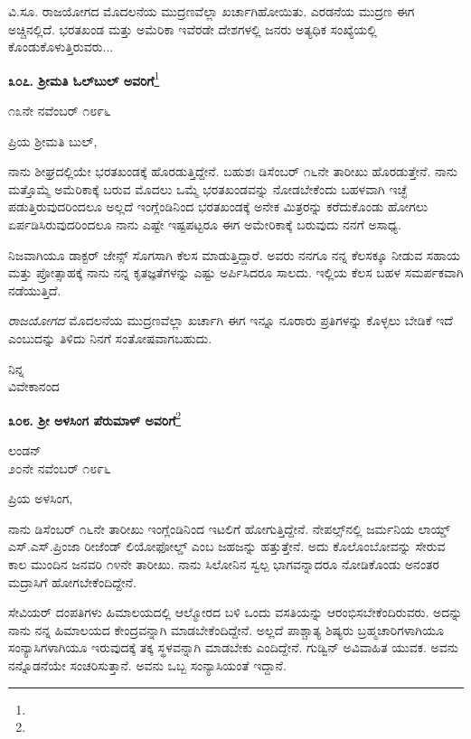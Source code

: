 ವಿ.ಸೂ. ರಾಜಯೋಗದ ಮೊದಲನೆಯ ಮುದ್ರಣವೆಲ್ಲಾ ಖರ್ಚಾಗಿಹೋಯಿತು. ಎರಡನೆಯ ಮುದ್ರಣ ಈಗ ಅಚ್ಚಿನಲ್ಲಿದೆ. ಭರತಖಂಡ ಮತ್ತು ಅಮೆರಿಕಾ ಇವೆರಡೇ ದೇಶಗಳಲ್ಲಿ ಜನರು ಅತ್ಯಧಿಕ ಸಂಖ್ಯೆಯಲ್ಲಿ ಕೊಂಡುಕೊಳುತ್ತಿರುವರು...

\begin{center}
\textbf{೩೦೭. ಶ‍್ರೀಮತಿ ಓಲ್‌ಬುಲ್‌ ಅವರಿಗೆ}\footnote{}
\end{center}

\begin{flushright}
೧೩ನೇ ನವೆಂಬರ್ ೧೮೯೬
\end{flushright}

\noindent
ಪ್ರಿಯ ಶ‍್ರೀಮತಿ ಬುಲ್,

ನಾನು ಶೀಘ್ರದಲ್ಲಿಯೇ ಭರತಖಂಡಕ್ಕೆ ಹೊರಡುತ್ತಿದ್ದೇನೆ. ಬಹುಶಃ ಡಿಸೆಂಬರ್ ೧೬ನೇ ತಾರೀಖು ಹೊರಡುತ್ತೇನೆ. ನಾನು ಮತ್ತೊಮ್ಮೆ ಅಮೆರಿಕಾಕ್ಕೆ ಬರುವ ಮೊದಲು ಒಮ್ಮೆ ಭರತಖಂಡವನ್ನು ನೋಡಬೇಕೆಂದು ಬಹಳವಾಗಿ ಇಚ್ಛೆ ಪಡುತ್ತಿರುವುದರಿಂದಲೂ ಅಲ್ಲದೆ ಇಂಗ್ಲೆಂಡಿನಿಂದ ಭರತಖಂಡಕ್ಕೆ ಅನೇಕ ಮಿತ್ರರನ್ನು ಕರೆದುಕೊಂಡು ಹೋಗಲು ಏರ್ಪಡಿಸಿರುವುದರಿಂದಲೂ ನಾನು ಎಷ್ಟೇ ಇಷ್ಟಪಟ್ಟರೂ ಈಗ ಅಮೇರಿಕಾಕ್ಕೆ ಬರುವುದು ನನಗೆ ಅಸಾಧ್ಯ.

ನಿಜವಾಗಿಯೂ ಡಾಕ್ಟರ್‌ ಜೇನ್ಸ್ ಸೊಗಸಾಗಿ ಕೆಲಸ ಮಾಡುತ್ತಿದ್ದಾರೆ. ಅವರು ನನಗೂ ನನ್ನ ಕೆಲಸಕ್ಕೂ ನೀಡುವ ಸಹಾಯ ಮತ್ತು ಪ್ರೋತ್ಸಾಹಕ್ಕೆ ನಾನು ನನ್ನ ಕೃತಜ್ಞತೆಗಳನ್ನು ಎಷ್ಟು ಅರ್ಪಿಸಿದರೂ ಸಾಲದು. ಇಲ್ಲಿಯ ಕೆಲಸ ಬಹಳ ಸಮರ್ಪಕವಾಗಿ ನಡೆಯುತ್ತಿದೆ.

\textit{ರಾಜಯೋಗದ} ಮೊದಲನೆಯ ಮುದ್ರಣವೆಲ್ಲಾ ಖರ್ಚಾಗಿ ಈಗ ಇನ್ನೂ ನೂರಾರು ಪ್ರತಿಗಳನ್ನು ಕೊಳ್ಳಲು ಬೇಡಿಕೆ ಇದೆ ಎಂಬುದನ್ನು ತಿಳಿದು ನಿನಗೆ ಸಂತೋಷವಾಗಬಹುದು.

{\flushright
ನಿನ್ನ\\ವಿವೇಕಾನಂದ\par}

\begin{center}
\textbf{೩೦೮. ಶ‍್ರೀ ಅಳಸಿಂಗ ಪೆರುಮಾಳ್ ಅವರಿಗೆ}\footnote{}
\end{center}

\begin{flushright}
ಲಂಡನ್\\೨೦ನೇ ನವೆಂಬರ್ ೧೮೯೬
\end{flushright}

\noindent
ಪ್ರಿಯ ಅಳಸಿಂಗ,

ನಾನು ಡಿಸೆಂಬರ್ ೧೬ನೇ ತಾರೀಖು ಇಂಗ್ಲೆಂಡಿನಿಂದ ಇಟಲಿಗೆ ಹೋಗುತ್ತಿದ್ದೇನೆ. ನೇಪಲ್ಸ್‌ನಲ್ಲಿ ಜರ್ಮನಿಯ ಲಾಯ್ಡ್‌ ಎಸ್‌.ಎಸ್‌.ಪ್ರಿಂಜಾ ರೀಜೆಂಡ್ ಲಿಯೋಫೋಲ್ಡ್ ಎಂಬ ಜಹಜನ್ನು ಹತ್ತುತ್ತೇನೆ. ಅದು ಕೊಲೊಂಬೋವನ್ನು ಸೇರುವ ಕಾಲ ಮುಂದಿನ ಜನವರಿ ೧೪ನೇ ತಾರೀಖು. ನಾನು ಸಿಲೋನಿನ ಸ್ವಲ್ಪ ಭಾಗವನ್ನಾದರೂ ನೋಡಿಕೊಂಡು ಅನಂತರ ಮದ್ರಾಸಿಗೆ ಹೋಗಬೇಕೆಂದಿದ್ದೇನೆ.

ಸೇವಿಯರ್ ದಂಪತಿಗಳು ಹಿಮಾಲಯದಲ್ಲಿ ಆಲ್ಮೋರದ ಬಳಿ ಒಂದು ವಸತಿಯನ್ನು ಆರಂಭಿಸಬೇಕೆಂದಿರುವರು. ಅದನ್ನು ನಾನು ನನ್ನ ಹಿಮಾಲಯದ ಕೇಂದ್ರವನ್ನಾಗಿ ಮಾಡಬೇಕೆಂದಿದ್ದೇನೆ. ಅಲ್ಲದೆ ಪಾಶ್ಚಾತ್ಯ ಶಿಷ್ಯರು ಬ್ರಹ್ಮಚಾರಿಗಳಾಗಿಯೂ ಸಂನ್ಯಾಸಿಗಳಾಗಿಯೂ ಇರುವುದಕ್ಕೆ ತಕ್ಕ ಸ್ಥಳವನ್ನಾಗಿ ಮಾಡಬೇಕು ಎಂದಿದ್ದೇನೆ. ಗುಡ್ವಿನ್ ಅವಿವಾಹಿತ ಯುವಕ. ಅವನು ನನ್ನೊಡನೆಯೇ ಸಂಚರಿಸುತ್ತಾನೆ. ಅವನು ಒಬ್ಬ ಸಂನ್ಯಾಸಿಯಂತೆ ಇದ್ದಾನೆ.


